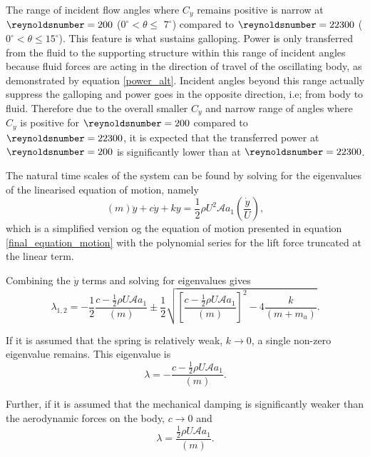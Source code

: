   
  The range of incident flow angles where $C_y$ remains positive is narrow at $\reynoldsnumber=200$ ($0^\circ <\theta \leq$ $7^\circ$) compared to $\reynoldsnumber=22300$ ($0^\circ <\theta \leq 15^\circ$). This feature is what sustains galloping. Power is only transferred from the fluid to the supporting structure within this range of incident angles because fluid forces are acting in the direction of travel of the oscillating body, as demonstrated by equation \ref{power_alt}. Incident angles beyond this range actually suppress the galloping and power goes in the opposite direction, i.e; from body to fluid. Therefore due to the overall smaller $C_y$ and narrow range of angles where $C_y$ is positive for $\reynoldsnumber=200$ compared to $\reynoldsnumber=22300$, it is expected that the transferred power at $\reynoldsnumber=200$ is significantly lower than at $\reynoldsnumber=22300$.
  
 

  The natural time scales of the system can be found by solving for the eigenvalues of the linearised equation of motion, namely
 \begin{equation}
 \label{eqn:eom_linear}
 (m)\ddot{y}{+}c\dot{y}{+}ky{=}\frac{1}{2}\rho U^2 \mathcal{A} a_1\left(\frac{\dot{y}}{U}\right),
 \end{equation}
 which is a simplified version og the equation of motion presented in equation \ref{final_equation_motion} with the polynomial series for the lift force truncated at the linear term.
 
 Combining the $\dot{y}$ terms and solving for eigenvalues gives
 \begin{equation}
   \label{eqn:eigs}
   \lambda_{1,2}= -\frac{1}{2}\frac{c-\frac{1}{2}\rho U\mathcal{A}a_1}{(m)}\pm\frac{1}{2}\sqrt{\left[\frac{c-\frac{1}{2}\rho U\mathcal{A}a_1}{(m)}\right]^2-4\frac{k}{(m+m_a)}}.
 \end{equation}
 
 If it is assumed that the spring is relatively weak, $k\rightarrow 0$, a single non-zero eigenvalue remains. This eigenvalue is
 \begin{equation}
   \label{eqn:eigs_nospring}
   \lambda=-\frac{c-\frac{1}{2}\rho U\mathcal{A}a_1}{(m)}.
 \end{equation}
 
 Further, if it is assumed that the mechanical damping is significantly weaker than the aerodynamic forces on the body, $c\rightarrow 0$ and
 \begin{equation}
   \label{eqn:eigs_nospring_nodamp}
   \lambda=\frac{\frac{1}{2}\rho U\mathcal{A}a_1}{(m)}.
 \end{equation}
 

